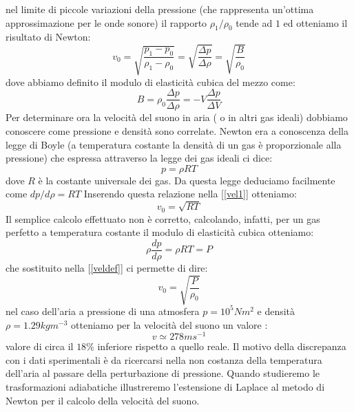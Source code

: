 \documentclass[a4paper,10pt,twoside]{article}
\begin{document}
nel limite di piccole variazioni della pressione (che rappresenta un'ottima approssimazione per le onde sonore) il rapporto $\rho_1/\rho_0$ tende ad $1$ ed otteniamo il risultato di Newton:
\begin{equation}\label{veldef}
 v_0=\sqrt{\frac{p_1-p_0}{\rho_1-\rho_0}}=\sqrt{\frac{\Delta p}{\Delta \rho}}=\sqrt{\frac{B}{\rho_0}}
\end{equation}
 dove abbiamo definito il modulo di elasticità cubica del mezzo come:
\begin{equation}
 B=\rho_0 \frac{\Delta p}{\Delta \rho}=-V\frac{\Delta p}{\Delta V}
\end{equation}
Per determinare ora la velocità del suono in aria ( o in altri gas ideali) dobbiamo conoscere come pressione e densità sono correlate. Newton era a conoscenza della legge di Boyle (a temperatura costante la densità di un gas è proporzionale alla pressione) che espressa attraverso la legge dei gas ideali ci dice:
\begin{equation}
 p=\rho RT
\end{equation}
dove $R$ è la costante universale dei gas. Da questa legge deduciamo facilmente come $dp/d\rho=RT$ Inserendo questa relazione nella [\ref{vel1}] otteniamo:
\begin{equation}\label{vel2}
 v_0=\sqrt{RT}
\end{equation}
Il semplice calcolo effettuato non è corretto, calcolando, infatti, per un gas perfetto a temperatura costante il modulo di elasticità cubica otteniamo:
\begin{equation}
 \rho\frac{dp}{d\rho}=\rho RT=P
\end{equation}
che sostituito nella [\ref{veldef}] ci permette di dire:
\begin{equation}
 v_0=\sqrt{\frac{P}{\rho_0}}
\end{equation}
nel caso dell'aria a pressione di una atmosfera $p=10^5Nm^2$ e densità $\rho=1.29 kgm^{-3}$ otteniamo per la velocità  del suono un valore :
\begin{equation}
 v\simeq 278ms^{-1}
\end{equation}
valore di circa il $18\%$ inferiore rispetto a quello reale. Il motivo della discrepanza con i dati sperimentali è da ricercarsi nella non costanza della temperatura dell'aria al passare della perturbazione di pressione. Quando studieremo le trasformazioni adiabatiche illustreremo l'estensione di Laplace al metodo di Newton per il calcolo della velocità del suono. 


 
 
\end{document}
